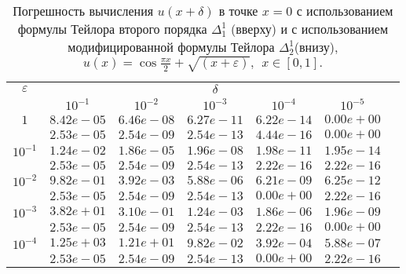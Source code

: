 \documentclass[10pt,twoside]{uz_kgu}
\begin{document}
\begin{table} [!htb]
	\caption {Погрешность вычисления $u(x+ \delta)$ в точке $x=0$ с использованием формулы Тейлора второго порядка $\Delta_1^1$ (вверху) и с использованием модифицированной формулы Тейлора $\Delta_2^1$(внизу),
	$u(x)=  \cos \frac{\pi x}{2} + \sqrt{(x+\varepsilon)} ,\ \    x\in [0,1].$}
	\begin{center}
		\begin{tabular}{|c|c|c|c|c|c|c}
			\cline{1-6} $\varepsilon$ & \multicolumn{5}{c|}{$\delta$} \\
			\cline{2-6} &$10^{-1}$ & $10^{-2}$ & $10^{-3}$  & $10^{-4}$& $10^{-5}$\\
			\cline{1-6}
			$1$
			&$8.42e-05$&$6.46e-08$&$6.27e-11$&$6.22e-14$& $0.00e+00$\\
			&$2.53e-05$&$2.54e-09$&$2.54e-13$&$4.44e-16$& $0.00e+00$\\
			\cline{1-6}
			$10^{-1}$
			&$1.24e-02$&$1.86e-05$&$1.96e-08$&$1.98e-11$&$1.95e-14$\\
			&$2.53e-05$&$2.54e-09$&$2.54e-13$&$2.22e-16$&$2.22e-16$\\
			\cline{1-6}
			$10^{-2}$
			&$9.82e-01$&$3.92e-03$&$5.88e-06$&$6.21e-09$&$6.25e-12$\\
			&$2.53e-05$&$2.54e-09$&$2.54e-13$&$0.00e+00$&$2.22e-16$\\
			\cline{1-6}
			$10^{-3}$
			&$3.82e+01$&$3.10e-01$&$1.24e-03$&$1.86e-06$&$1.96e-09$\\
			&$2.53e-05$&$2.54e-09$&$2.54e-13$&$2.22e-16$&$0.00e+00$\\
			\cline{1-6}
			$10^{-4}$
			&$1.25e+03$&$1.21e+01$&$9.82e-02$&$3.92e-04$&$5.88e-07$\\
			&$2.53e-05$&$2.54e-09$&$2.54e-13$&$0.00e+00$&$2.22e-16$\\
			\cline{1-6}
		\end{tabular}
	\end{center}
\end{table}
\end{document}
